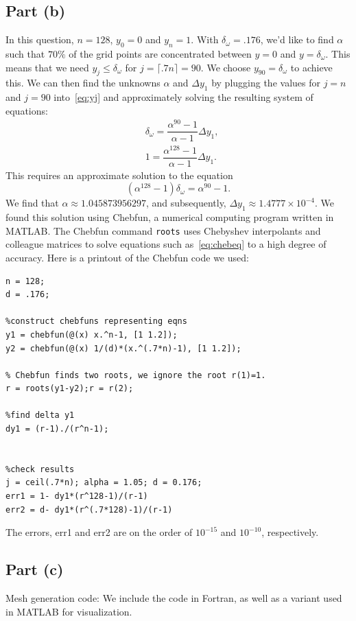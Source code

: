 \documentclass{article}
\begin{document}
\subsection{Part (b)}
In this question, $n = 128$, $y_0 = 0$ and $y_n=1$. With $\delta_\omega = .176$, we'd like to find $\alpha$ such that $70\%$ of the grid points are concentrated between $y=0$ and $y=\delta_\omega$.  
This means that we need $y_j \leq \delta_\omega$ for $j = \lceil.7n \rceil =  90$. We choose $y_{90} = \delta_\omega$ to achieve this. We can then find the unknowns $\alpha$ and $\Delta y_1$ by plugging the values for $j = n$ and $j = 90$ into~\eqref{eq:yj} and approximately solving the resulting system of equations:
\begin{align}
& \delta_\omega = \dfrac{\alpha^{90}-1}{\alpha -1} \Delta y_1 ,\\
&  1 = \dfrac{\alpha^{128}-1}{\alpha -1} \Delta y_1 .
\end{align}
This requires an approximate solution to the equation
\begin{equation} 
\label{eq:chebeq}
(\alpha^{128} -1) \delta_\omega = \alpha^{90}-1.
\end{equation}
We find that $\alpha \approx 1.045873956297$, and subsequently, $\Delta y_1 \approx 1.4777 \times 10^{-4}$. 
We found this solution using Chebfun, a numerical computing program written in MATLAB. The Chebfun command {\tt roots} uses Chebyshev interpolants and colleague matrices to solve equations such as~\eqref{eq:chebeq} to a high degree of accuracy. Here is a printout of the Chebfun code we used: 
\begin{verbatim}
n = 128; 
d = .176;

%construct chebfuns representing eqns
y1 = chebfun(@(x) x.^n-1, [1 1.2]); 
y2 = chebfun(@(x) 1/(d)*(x.^(.7*n)-1), [1 1.2]); 

% Chebfun finds two roots, we ignore the root r(1)=1. 
r = roots(y1-y2);r = r(2); 

%find delta y1
dy1 = (r-1)./(r^n-1); 


%check results
j = ceil(.7*n); alpha = 1.05; d = 0.176;
err1 = 1- dy1*(r^128-1)/(r-1)
err2 = d- dy1*(r^(.7*128)-1)/(r-1)
\end{verbatim}
The errors, err1 and err2 are on the order of $10^{-15}$ and $10^{-10}$, respectively. 

\subsection{Part (c)}
Mesh generation code: We include the code in Fortran, as well as a variant used in MATLAB for visualization. 
\end{document}
